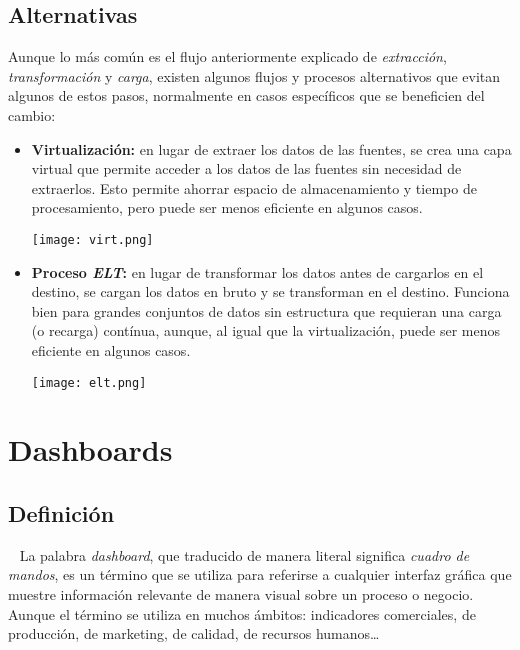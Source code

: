 \subsection{Alternativas}
Aunque lo más común es el flujo anteriormente explicado de \textit{extracción}, \textit{transformación} y
\textit{carga}, existen algunos flujos y procesos alternativos que evitan algunos de estos pasos, normalmente
en casos específicos que se beneficien del cambio:

\begin{itemize}
	\item \textbf{Virtualización:} en lugar de extraer los datos de las fuentes, se crea una capa virtual que
		permite acceder a los datos de las fuentes sin necesidad de extraerlos. Esto permite ahorrar espacio de
		almacenamiento y tiempo de procesamiento, pero puede ser menos eficiente en algunos casos.

		\begin{minipage}{0.9\linewidth}
			\texttt{[image: virt.png]}
		\end{minipage}
	\item \textbf{Proceso \textit{ELT}:} en lugar de transformar los datos antes de cargarlos en el destino,
		se cargan los datos en bruto y se transforman en el destino. Funciona bien para grandes conjuntos de
		datos sin estructura que requieran una carga (o recarga) contínua, aunque, al igual que la virtualización,
		puede ser menos eficiente en algunos casos.

		\begin{minipage}{0.9\linewidth}
			\texttt{[image: elt.png]}
		\end{minipage}
\end{itemize}


\newpage{}
\section{Dashboards}\label{sec:dashboards}
\subsection{Definición}~\cite{mier2023dashboards}
La palabra \textit{dashboard}, que traducido de manera literal significa \textit{cuadro de mandos},
es un término que se utiliza para referirse a cualquier interfaz gráfica que muestre información
relevante de manera visual sobre un proceso o negocio. Aunque el término se utiliza en
muchos ámbitos: indicadores comerciales, de producción, de marketing, de calidad, de recursos
humanos\ldots

